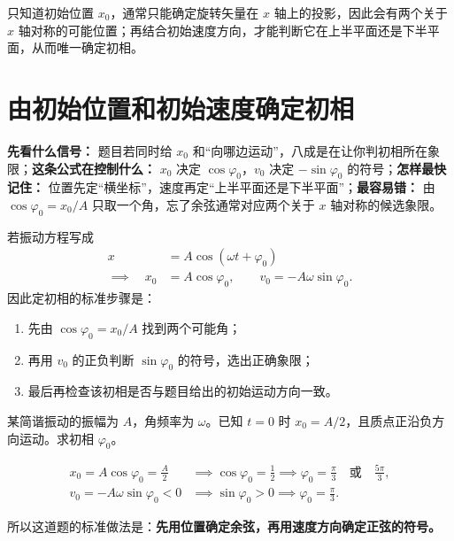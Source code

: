 \documentclass[lang=cn,11pt]{elegantbook}
\begin{document}
\begin{note}
只知道初始位置 \(x_0\)，通常只能确定旋转矢量在 \(x\) 轴上的投影，因此会有两个关于 \(x\) 轴对称的可能位置；再结合初始速度方向，才能判断它在上半平面还是下半平面，从而唯一确定初相。
\end{note}

\section{由初始位置和初始速度确定初相}

\begin{note}
\textbf{先看什么信号：} 题目若同时给 \(x_0\) 和“向哪边运动”，八成是在让你判初相所在象限；\textbf{这条公式在控制什么：} \(x_0\) 决定 \(\cos\varphi_0\)，\(v_0\) 决定 \(-\sin\varphi_0\) 的符号；\textbf{怎样最快记住：} 位置先定“横坐标”，速度再定“上半平面还是下半平面”；\textbf{最容易错：} 由 \(\cos\varphi_0=x_0/A\) 只取一个角，忘了余弦通常对应两个关于 \(x\) 轴对称的候选象限。
\end{note}

若振动方程写成
\[
\begin{aligned}
x&=A\cos(\omega t+\varphi_0) \\
\implies\quad x_0&=A\cos\varphi_0,\qquad v_0=-A\omega\sin\varphi_0.
\end{aligned}
\]
因此定初相的标准步骤是：
\begin{enumerate}
  \item 先由 \(\cos\varphi_0=x_0/A\) 找到两个可能角；
  \item 再用 \(v_0\) 的正负判断 \(\sin\varphi_0\) 的符号，选出正确象限；
  \item 最后再检查该初相是否与题目给出的初始运动方向一致。
\end{enumerate}

\begin{example}[由位置和速度确定初相]
某简谐振动的振幅为 \(A\)，角频率为 \(\omega\)。已知 \(t=0\) 时 \(x_0=A/2\)，且质点正沿负方向运动。求初相 \(\varphi_0\)。
\end{example}

\begin{solution}
\[
\begin{aligned}
x_0=A\cos\varphi_0=\frac{A}{2}
&\implies \cos\varphi_0=\frac{1}{2}
\implies \varphi_0=\frac{\pi}{3}\quad \text{或}\quad \frac{5\pi}{3},\\
v_0=-A\omega\sin\varphi_0<0
&\implies \sin\varphi_0>0
\implies \varphi_0=\frac{\pi}{3}.
\end{aligned}
\]

所以这道题的标准做法是：\textbf{先用位置确定余弦，再用速度方向确定正弦的符号。}
\end{solution}
\end{document}
